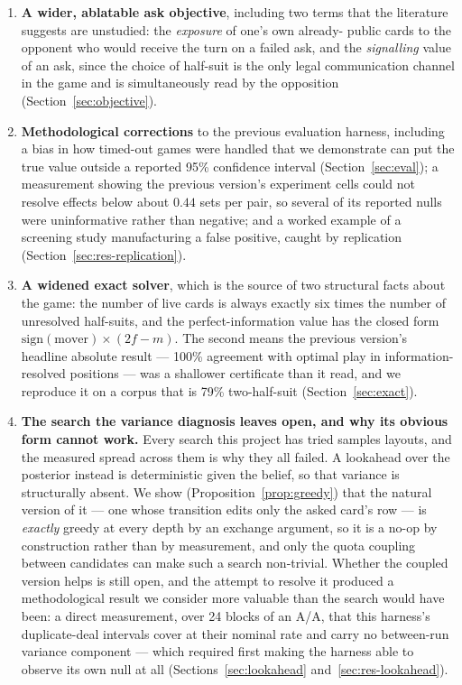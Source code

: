 \documentclass[11pt,a4paper]{article}
\begin{document}
\begin{enumerate}
\item \textbf{A wider, ablatable ask objective}, including two terms that the
literature suggests are unstudied: the \emph{exposure} of one's own already-
public cards to the opponent who would receive the turn on a failed ask, and
the \emph{signalling} value of an ask, since the choice of half-suit is the
only legal communication channel in the game and is simultaneously read by the
opposition (Section~\ref{sec:objective}).

\item \textbf{Methodological corrections} to the previous evaluation harness,
including a bias in how timed-out games were handled that we demonstrate can
put the true value outside a reported 95\% confidence interval
(Section~\ref{sec:eval}); a measurement showing the previous version's
experiment cells could not resolve effects below about $0.44$ sets per pair, so
several of its reported nulls were uninformative rather than negative; and a
worked example of a screening study manufacturing a false positive, caught by
replication (Section~\ref{sec:res-replication}).

\item \textbf{A widened exact solver}, which is the source of two structural
facts about the game: the number of live cards is always exactly six times the
number of unresolved half-suits, and the perfect-information value has the
closed form $\mathrm{sign}(\text{mover}) \times (2f - m)$. The second means the
previous version's headline absolute result --- 100\% agreement with optimal
play in information-resolved positions --- was a shallower certificate than it
read, and we reproduce it on a corpus that is 79\% two-half-suit
(Section~\ref{sec:exact}).

\item \textbf{The search the variance diagnosis leaves open, and why its obvious
form cannot work.} Every search this project has tried samples layouts, and the
measured spread across them is why they all failed. A lookahead over the
posterior instead is deterministic given the belief, so that variance is
structurally absent. We show (Proposition~\ref{prop:greedy}) that the natural
version of it --- one whose transition edits only the asked card's row --- is
\emph{exactly} greedy at every depth by an exchange argument, so it is a no-op by
construction rather than by measurement, and only the quota coupling between
candidates can make such a search non-trivial. Whether the coupled version helps is still
open, and the attempt to resolve it produced a methodological result we consider
more valuable than the search would have been: a direct measurement, over 24
blocks of an A/A, that this harness's duplicate-deal intervals cover at their
nominal rate and carry no between-run variance component --- which required first
making the harness able to observe its own null at all
(Sections~\ref{sec:lookahead} and~\ref{sec:res-lookahead}).
\end{enumerate}
\end{document}
